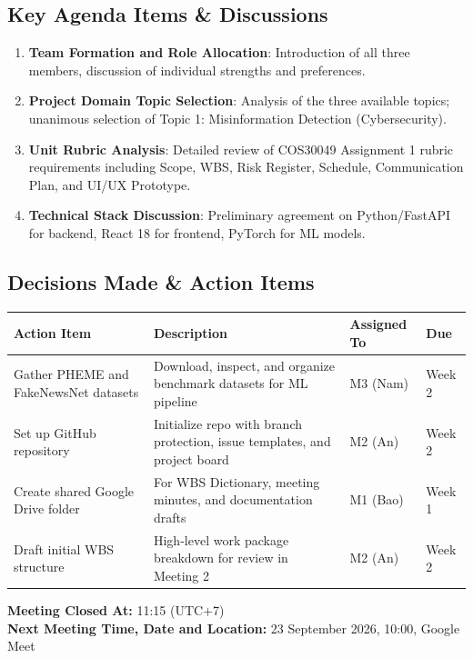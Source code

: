 \documentclass[11pt, a4paper]{article}
\begin{document}
\subsection*{Key Agenda Items \& Discussions}
\begin{enumerate}
  \item \textbf{Team Formation and Role Allocation}: Introduction of all three members, discussion of individual strengths and preferences.
  \item \textbf{Project Domain Topic Selection}: Analysis of the three available topics; unanimous selection of Topic 1: Misinformation Detection (Cybersecurity).
  \item \textbf{Unit Rubric Analysis}: Detailed review of COS30049 Assignment 1 rubric requirements including Scope, WBS, Risk Register, Schedule, Communication Plan, and UI/UX Prototype.
  \item \textbf{Technical Stack Discussion}: Preliminary agreement on Python/FastAPI for backend, React 18 for frontend, PyTorch for ML models.
\end{enumerate}

\subsection*{Decisions Made \& Action Items}

\begin{table}[H]
  \centering
  \scriptsize
  \begin{tabularx}{\linewidth}{@{}L{6cm} L{3cm} L{2cm} L{2cm}@{}}
    \toprule
    \textbf{Action Item} & \textbf{Description} & \textbf{Assigned To} & \textbf{Due} \\
    \midrule
    Gather PHEME and FakeNewsNet datasets & Download, inspect, and organize benchmark datasets for ML pipeline & M3 (Nam) & Week 2 \\
    Set up GitHub repository & Initialize repo with branch protection, issue templates, and project board & M2 (An) & Week 2 \\
    Create shared Google Drive folder & For WBS Dictionary, meeting minutes, and documentation drafts & M1 (Bao) & Week 1 \\
    Draft initial WBS structure & High-level work package breakdown for review in Meeting 2 & M2 (An) & Week 2 \\
    \bottomrule
  \end{tabularx}
\end{table}

\vspace{0.3cm}
\noindent \textbf{Meeting Closed At:} 11:15 (UTC+7)\\
\textbf{Next Meeting Time, Date and Location:} 23 September 2026, 10:00, Google Meet
\end{document}
